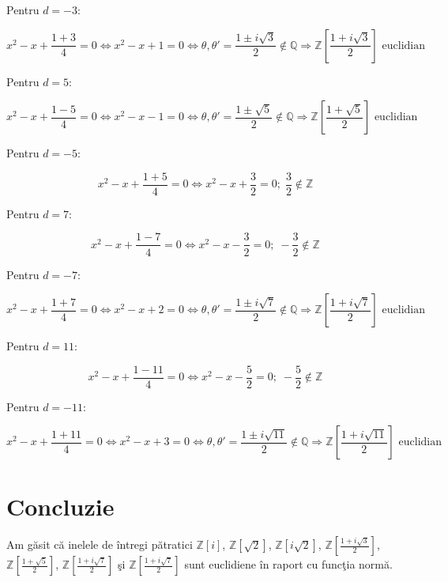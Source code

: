 \documentclass[12pt]{article}
\begin{document}
Pentru $d = -3$:

\begin{equation*}
    x^2 - x + \frac{1 + 3}{4} = 0
    \Leftrightarrow x^2 - x + 1 = 0
    \Leftrightarrow \theta, \theta' = \frac{1 \pm i\sqrt{3}}{2} \notin \mathbb{Q}
    \Rightarrow \boxed{\mathbb{Z}\left[\frac{1 + i\sqrt{3}}{2}\right] \text{ euclidian}}
\end{equation*}

Pentru $d = 5$:

\begin{equation*}
    x^2 - x + \frac{1 - 5}{4} = 0
    \Leftrightarrow x^2 - x - 1 = 0
    \Leftrightarrow \theta, \theta' = \frac{1 \pm \sqrt{5}}{2} \notin \mathbb{Q}
    \Rightarrow \boxed{\mathbb{Z}\left[\frac{1 + \sqrt{5}}{2}\right] \text{ euclidian}}
\end{equation*}

Pentru $d = -5$:

\begin{equation*}
    x^2 - x + \frac{1 + 5}{4} = 0
    \Leftrightarrow x^2 - x + \frac{3}{2} = 0; \; \frac{3}{2} \notin \mathbb{Z}
\end{equation*}

Pentru $d = 7$:

\begin{equation*}
    x^2 - x + \frac{1 - 7}{4} = 0
    \Leftrightarrow x^2 - x - \frac{3}{2} = 0; \; -\frac{3}{2} \notin \mathbb{Z}
\end{equation*}

Pentru $d = -7$:

\begin{equation*}
    x^2 - x + \frac{1 + 7}{4} = 0
    \Leftrightarrow x^2 - x + 2 = 0
    \Leftrightarrow \theta, \theta' = \frac{1 \pm i\sqrt{7}}{2} \notin \mathbb{Q}
    \Rightarrow \boxed{\mathbb{Z}\left[\frac{1 + i\sqrt{7}}{2}\right] \text{ euclidian}}
\end{equation*}

Pentru $d = 11$:

\begin{equation*}
    x^2 - x + \frac{1 - 11}{4} = 0
    \Leftrightarrow x^2 - x - \frac{5}{2} = 0; \; -\frac{5}{2} \notin \mathbb{Z}
\end{equation*}

Pentru $d = -11$:

\begin{equation*}
    x^2 - x + \frac{1 + 11}{4} = 0
    \Leftrightarrow x^2 - x + 3 = 0
    \Leftrightarrow \theta, \theta' = \frac{1 \pm i\sqrt{11}}{2} \notin \mathbb{Q}
    \Rightarrow \boxed{\mathbb{Z}\left[\frac{1 + i\sqrt{11}}{2}\right] \text{ euclidian}}
\end{equation*}

\section*{Concluzie}
Am găsit că inelele de întregi pătratici
$\mathbb{Z}[i]$,
$\mathbb{Z}[\sqrt{2}]$,
$\mathbb{Z}[i\sqrt{2}]$,
$\mathbb{Z}\left[\frac{1 + i\sqrt{3}}{2}\right]$,
$\mathbb{Z}\left[\frac{1 + \sqrt{5}}{2}\right]$,
$\mathbb{Z}\left[\frac{1 + i\sqrt{7}}{2}\right]$ şi
$\mathbb{Z}\left[\frac{1 + i\sqrt{7}}{2}\right]$
sunt euclidiene în raport cu funcţia normă.
\end{document}
